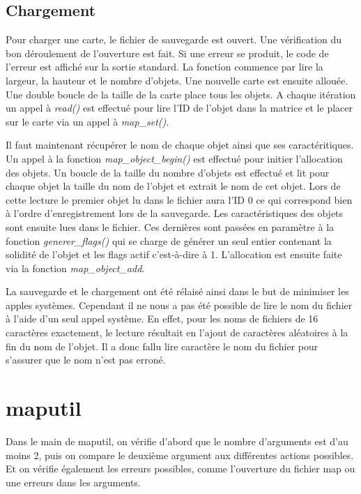 \documentclass[10pt,a4paper]{article}
\begin{document}
\subsection{Chargement}

	Pour charger une carte, le fichier de sauvegarde est ouvert. Une vérification du bon déroulement de l'ouverture est fait. Si une erreur se produit, le code de l'erreur est affiché sur la sortie standard. La fonction commence par lire la largeur, la hauteur et le nombre d'objets. Une nouvelle carte est ensuite allouée. Une double boucle de la taille de la carte place tous les objets. A chaque itération un appel à \textit{read()} est effectué pour lire l'ID de l'objet dans la matrice et le placer sur le carte via un appel à \textit{map\_set()}.
	
	Il faut maintenant récupérer le nom de chaque objet ainsi que ses caractéritiques. Un appel à la fonction \textit{map\_object\_begin()} est effectué pour initier l'allocation des objets. Un boucle de la taille du nombre d'objets est effectué et lit pour chaque objet la taille du nom de l'objet et extrait le nom de cet objet. Lors de cette lecture le premier objet lu dans le fichier aura l'ID 0 ce qui correspond bien à l'ordre d'enregistrement lors de la sauvegarde. Les caractéristiques des objets sont ensuite lues dans le fichier. Ces dernières sont passées en paramètre à la fonction \textit{generer\_flags()} qui se charge de générer un seul entier contenant la solidité de l'objet et les flags actif c'est-à-dire à 1. L'allocation est ensuite faite via la fonction \textit{map\_object\_add}.
	
	La sauvegarde et le chargement ont été rélaisé ainsi dans le but de minimiser les apples systèmes. Cependant il ne nous a pas été possible de lire le nom du fichier à l'aide d'un seul appel système. En effet, pour les noms de fichiers de 16 caractères exactement, le lecture résultait en l'ajout de caractères aléatoires à la fin du nom de l'objet. Il a donc fallu lire caractère le nom du fichier pour s'assurer que le nom n'est pas erroné. 
	

\section{maputil}
    Dans le main de maputil, on vérifie d'abord que le nombre d'arguments est d'au moins 2, puis on compare le deuxième argument aux différentes actions possibles. Et on vérifie également les erreurs possibles, comme l'ouverture du fichier map ou une erreurs dans les arguments.
\end{document}
